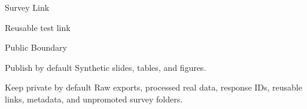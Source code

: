 \documentclass[aspectratio=169]{beamer}
\begin{document}
\begin{frame}{Survey Link}
  \begin{block}{Reusable test link}
  \end{block}
\end{frame}

\begin{frame}{Public Boundary}
  \begin{block}{Publish by default}
    Synthetic slides, tables, and figures.
  \end{block}
  \begin{block}{Keep private by default}
    Raw exports, processed real data, response IDs, reusable links, metadata, and unpromoted survey folders.
  \end{block}
\end{frame}
\end{document}
